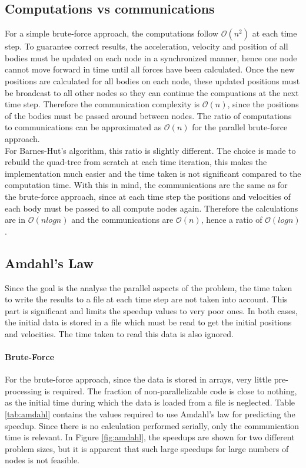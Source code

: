 \subsection{Computations vs communications}
For a simple brute-force approach, the computations follow $\mathcal{O}(n^2)$ at each time step. To guarantee correct results, the acceleration, velocity and position of all bodies must be updated on each node in a synchronized manner, hence one node cannot move forward in time until all forces have been calculated. Once the new positions are calculated for all bodies on each node, these updated positions must be broadcast to all other nodes so they can continue the compuations at the next time step. Therefore the communication complexity is $\mathcal{O}(n)$, since the positions of the bodies must be passed around between nodes. The ratio of computations to communications can be approximated as $\mathcal{O}(n)$ for the parallel brute-force approach.\\
For Barnes-Hut's algorithm, this ratio is slightly different. The choice is made to rebuild the quad-tree from scratch at each time iteration, this makes the implementation much easier and the time taken is not significant compared to the computation time. With this in mind, the communications are the same as for the brute-force approach, since at each time step the positions and velocities of each body must be passed to all compute nodes again. Therefore the calculations are in $\mathcal{O}(nlogn)$ and the communications are $\mathcal{O}(n)$, hence a ratio of $\mathcal{O}(logn)$.
\subsection{Amdahl's Law}
Since the goal is the analyse the parallel aspects of the problem, the time taken to write the results to a file at each time step are not taken into account. This part is significant and limits the speedup values to very poor ones. In both cases, the initial data is stored in a file which must be read to get the initial positions and velocities. The time taken to read this data is also ignored.
\paragraph{Brute-Force} For the brute-force approach, since the data is stored in arrays, very little pre-processing is required. The fraction of non-parallelizable code is close to nothing, as the initial time during which the data is loaded from a file is neglected. Table \ref{tab:amdahl} contains the values required to use Amdahl's law for predicting the speedup. Since there is no calculation performed serially, only the communication time is relevant. In Figure \ref{fig:amdahl}, the speedups are shown for two different problem sizes, but it is apparent that such large speedups for large numbers of nodes is not feasible.

